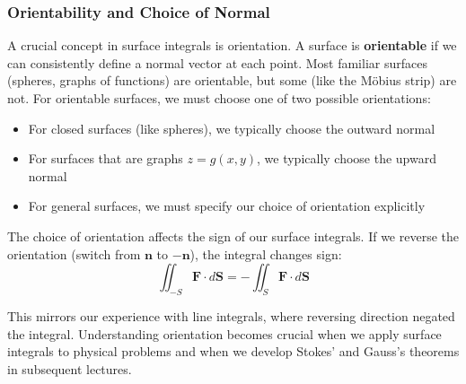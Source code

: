 \subsubsection*{Orientability and Choice of Normal}

\noindent A crucial concept in surface integrals is orientation. A surface is \textbf{orientable} if we can consistently define a normal vector at each point. Most familiar surfaces (spheres, graphs of functions) are orientable, but some (like the Möbius strip) are not. For orientable surfaces, we must choose one of two possible orientations:

\begin{itemize}
    \item For closed surfaces (like spheres), we typically choose the outward normal
    \item For surfaces that are graphs $z = g(x,y)$, we typically choose the upward normal
    \item For general surfaces, we must specify our choice of orientation explicitly
\end{itemize}

\noindent The choice of orientation affects the sign of our surface integrals. If we reverse the orientation (switch from $\mathbf{n}$ to $-\mathbf{n}$), the integral changes sign:
\[
\iint_{-S} \mathbf{F} \cdot d\mathbf{S} = -\iint_S \mathbf{F} \cdot d\mathbf{S}
\]

\noindent This mirrors our experience with line integrals, where reversing direction negated the integral. Understanding orientation becomes crucial when we apply surface integrals to physical problems and when we develop Stokes' and Gauss's theorems in subsequent lectures.

